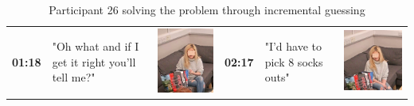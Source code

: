 \documentclass[twocolumn, serif, empirical, authordate]{jote-article}
\begin{document}
\begin{table}[ht!] \sffamily
\caption{Participant 26 solving the problem through incremental guessing}
\label{tab:table2}
\begin{mdframed}[linecolor=jotedark]
\renewcommand{\arraystretch}{1.5}
\begin{tabularx}{\linewidth}{@{} p{.05\linewidth} p{.28\linewidth} >{\raggedleft\arraybackslash}p{.1\linewidth}  p{.05\linewidth} p{.28\linewidth} >{\raggedleft\arraybackslash}p{.1\linewidth} @{}}
 \textbf{01:18}  & "Oh what and if I get it right you'll tell me?"  &  \includegraphics[height=.09\textheight, valign=t]{media/image14.png}  &
 \textbf{02:17} & "I'd have to pick 8 socks outs" & \includegraphics[height=.09\textheight, valign=t]{media/image22.png} \\ 
 

\end{tabularx}
\end{mdframed}
\end{table}
\end{document}
